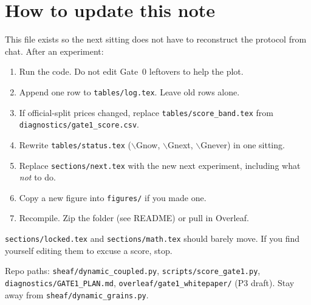 \section{How to update this note}
\label{sec:howto}

This file exists so the next sitting does not have to reconstruct the
protocol from chat. After an experiment:

\begin{enumerate}
\item Run the code. Do not edit Gate~0 leftovers to help the plot.
\item Append one row to \texttt{tables/log.tex}. Leave old rows alone.
\item If official-split prices changed, replace
      \texttt{tables/score\_band.tex} from \texttt{diagnostics/gate1\_score.csv}.
\item Rewrite \texttt{tables/status.tex} (\(\backslash\)Gnow, \(\backslash\)Gnext,
      \(\backslash\)Gnever) in one sitting.
\item Replace \texttt{sections/next.tex} with the new next experiment,
      including what \emph{not} to do.
\item Copy a new figure into \texttt{figures/} if you made one.
\item Recompile. Zip the folder (see README) or pull in Overleaf.
\end{enumerate}

\texttt{sections/locked.tex} and \texttt{sections/math.tex} should barely
move. If you find yourself editing them to excuse a score, stop.

Repo paths: \texttt{sheaf/dynamic\_coupled.py},
\texttt{scripts/score\_gate1.py}, \texttt{diagnostics/GATE1\_PLAN.md},
\texttt{overleaf/gate1\_whitepaper/} (P3 draft).
Stay away from \texttt{sheaf/dynamic\_grains.py}.
